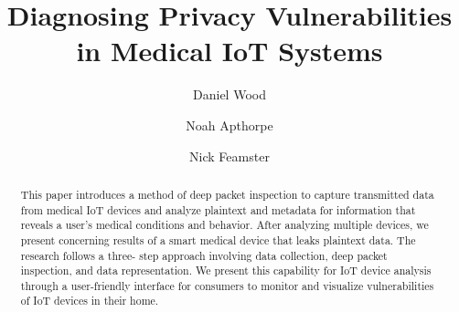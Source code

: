 \documentclass[sigconf]{acmart}
\begin{document}
\title{Diagnosing Privacy Vulnerabilities in Medical IoT Systems} %
\author{Daniel Wood}
\author{Noah Apthorpe}
\author{Nick Feamster}

\renewcommand{\shortauthors}{D. Wood et al.}


\begin{abstract} 
This paper introduces a method of deep packet inspection to
capture transmitted data from medical IoT devices and analyze plaintext and
metadata for information that reveals a user's medical conditions and
behavior. After analyzing multiple devices, we present concerning results of a
smart medical device that leaks plaintext data. The research follows a three-
step approach involving data collection, deep packet inspection, and data
representation. We present this capability for IoT device analysis
through a
user-friendly interface for consumers to monitor and visualize vulnerabilities
of IoT devices in their home.  
\end{abstract}


\maketitle



\balance
\end{document}
